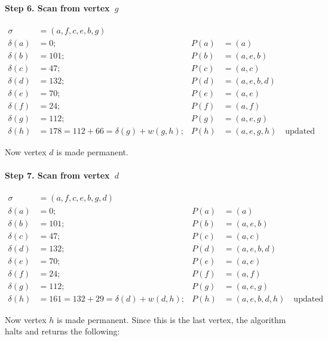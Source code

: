 \documentclass[10pt,]{book}
\theoremstyle{plain}
\theoremstyle{definition}
\theoremstyle{definition}
\theoremstyle{definition}
\theoremstyle{definition}
\numberwithin{equation}{section}
\newcommand{\amp}{&}
\begin{document}
\paragraph[{Step 6.  Scan from vertex~\(g\)}]{Step 6.  Scan from vertex~\(g\)}\hypertarget{paragraphs-6}{}
\hypertarget{p-209}{}%
%
\begin{align*}
\sigma\amp=(a,f,c,e,b,g)\\
\delta(a)\amp=0; \amp P(a)\amp=(a)\\
\delta(b)\amp=101; \amp P(b)\amp=(a,e,b)\\
\delta(c)\amp=47; \amp P(c)\amp=(a,c)\\
\delta(d)\amp= 132; \amp P(d)\amp=(a,e,b,d)\\
\delta(e)\amp=70; \amp P(e)\amp=(a,e)\\
\delta(f)\amp=24; \amp P(f)\amp=(a,f)\\
\delta(g)\amp=112; \amp P(g)\amp=(a,e,g)\\
\delta(h)\amp=178 = 112+66=\delta(g)+w(g,h); \amp P(h)\amp=(a,e,g,h)\quad\text{updated}
\end{align*}
%
\par
\hypertarget{p-210}{}%
Now vertex \(d\) is made permanent.%
\typeout{************************************************}
\typeout{************************************************}
\paragraph[{Step 7.  Scan from vertex~\(d\)}]{Step 7.  Scan from vertex~\(d\)}\hypertarget{paragraphs-7}{}
\hypertarget{p-211}{}%
%
\begin{align*}
\sigma\amp=(a,f,c,e,b,g,d)\\
\delta(a)\amp=0; \amp P(a)\amp=(a)\\
\delta(b)\amp=101; \amp P(b)\amp=(a,e,b)\\
\delta(c)\amp=47; \amp P(c)\amp=(a,c)\\
\delta(d)\amp= 132; \amp P(d)\amp=(a,e,b,d)\\
\delta(e)\amp=70; \amp P(e)\amp=(a,e)\\
\delta(f)\amp=24; \amp P(f)\amp=(a,f)\\
\delta(g)\amp=112; \amp P(g)\amp=(a,e,g)\\
\delta(h)\amp=161 = 132+29=\delta(d)+w(d,h); \amp P(h)\amp=(a,e,b,d,h)\quad\text{updated}
\end{align*}
%
\par
\hypertarget{p-212}{}%
Now vertex \(h\) is made permanent. Since this is the last vertex, the algorithm halts and returns the following:%
\typeout{************************************************}
\typeout{************************************************}
\end{document}

